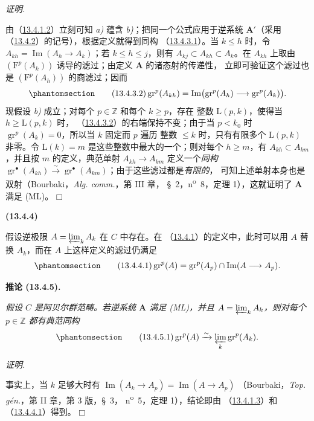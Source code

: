 \documentclass[UTF8,fontset=none,11pt,oneside,openany]{ctexbook}
\providecommand{\square}{\mdlgwhtsquare}
\newenvironment{env}[1][]{%
  \par\medskip\noindent\textbf{(#1)}\ %
}{\par}
\newenvironment{corollary}[1][]{%
  \par\medskip\noindent\textbf{推论 (#1).}\ %
}{\par}
\newenvironment{proof}{%
  \par\smallskip\noindent\textit{证明.}\ %
}{\hfill$\square$\par}
\newcommand{\oldpage}[2][]{%
  \hypertarget{ega-source-page-#1-#2}{}%
  \marginnote{\scriptsize\textbf{#1}~|~#2}\ignorespaces}
\let\EGAOriginalLabel\label
\renewcommand{\label}[1]{\phantomsection\EGAOriginalLabel{#1}}
\begin{document}
\begin{proof}
由（\hyperref[0.13.4.1.2-fr]{13.4.1.2}）立刻可知 \emph{a)} 蕴含
\emph{b)}；把同一个公式应用于逆系统 $\mathbf A'$（采用
（\hyperref[0.13.4.2-fr]{13.4.2}）的记号），根据定义就得到同构
（\hyperref[0.13.4.3.1-fr]{13.4.3.1}）。当 $k\leq h$ 时，令
$A_{kh}=\operatorname{Im}(A_h\to A_k)$；若 $k\leq h\leq j$，则有
$A_{kj}\subset A_{kh}\subset A_k$。在 $A_{kh}$ 上取由
$(\mathrm F^p(A_k))$ 诱导的滤过；由定义 $\mathbf A$ 的诸态射的传递性，
立即可验证这个滤过也是 $(\mathrm F^p(A_h))$ 的商滤过；因而
\begin{equation}
\label{0.13.4.3.2-fr}
\tag{13.4.3.2}
\operatorname{gr}^p(A_{kh})=
\operatorname{Im}\bigl(\operatorname{gr}^p(A_h)\longrightarrow
\operatorname{gr}^p(A_k)\bigr).
\end{equation}
\oldpage[0\textsubscript{III}]{71}
现假设 \emph{b)} 成立；对每个 $p\in\mathbb Z$ 和每个 $k\geq p$，存在
整数 $\mathrm L(p,k)$，使得当 $h\geq\mathrm L(p,k)$ 时，
（\hyperref[0.13.4.3.2-fr]{13.4.3.2}）的右端保持不变；由于当
$p<k_0$ 时 $\operatorname{gr}^p(A_k)=0$，所以当 $k$ 固定而 $p$ 遍历
整数 $\leq k$ 时，只有有限多个 $\mathrm L(p,k)$ 非零。令
$\mathrm L(k)=m$ 是这些整数中最大的一个；则对每个 $h\geq m$，有
$A_{kh}\subset A_{km}$，并且按 $m$ 的定义，典范单射
$A_{kh}\to A_{km}$ 定义一个\emph{同构}
$\operatorname{gr}^\bullet(A_{kh})\xrightarrow{\sim}
\operatorname{gr}^\bullet(A_{km})$；由于这些滤过都是\emph{有限的}，
可知上述单射本身也是双射（Bourbaki，\emph{Alg. comm.}，第 III 章，
§~2，n\textsuperscript{o}~8，定理 1），这就证明了 $\mathbf A$ 满足
(ML)。
\end{proof}

\begin{env}[13.4.4]
\label{0.13.4.4-fr}
假设逆极限 $A=\varprojlim_k A_k$ 在 $C$ 中存在。在
（\hyperref[0.13.4.1-fr]{13.4.1}）的定义中，此时可以用 $A$ 替换
$A_k$，而在 $A$ 上这样定义的滤过仍满足
\begin{equation}
\label{0.13.4.4.1-fr}
\tag{13.4.4.1}
\operatorname{gr}^p(A)=\operatorname{gr}^p(A_p)
\cap\operatorname{Im}(A\longrightarrow A_p).
\end{equation}
\end{env}

\begin{corollary}[13.4.5]
\label{0.13.4.5-fr}
\emph{假设 $C$ 是阿贝尔群范畴。若逆系统 $\mathbf A$ 满足 (ML)，并且
$A=\varprojlim_k A_k$，则对每个 $p\in\mathbb Z$ 都有典范同构}
\begin{equation}
\label{0.13.4.5.1-fr}
\tag{13.4.5.1}
\operatorname{gr}^p(A)\xrightarrow{\sim}
\varprojlim_k\operatorname{gr}^p(A_k).
\end{equation}
\end{corollary}
\begin{proof}
事实上，当 $k$ 足够大时有
$\operatorname{Im}(A_k\to A_p)=\operatorname{Im}(A\to A_p)$
（Bourbaki，\emph{Top. gén.}，第 II 章，第 3 版，§~3，
n\textsuperscript{o}~5，定理 1），结论即由
（\hyperref[0.13.4.1.3-fr]{13.4.1.3}）和
（\hyperref[0.13.4.4.1-fr]{13.4.4.1}）得到。
\end{proof}
\end{document}
